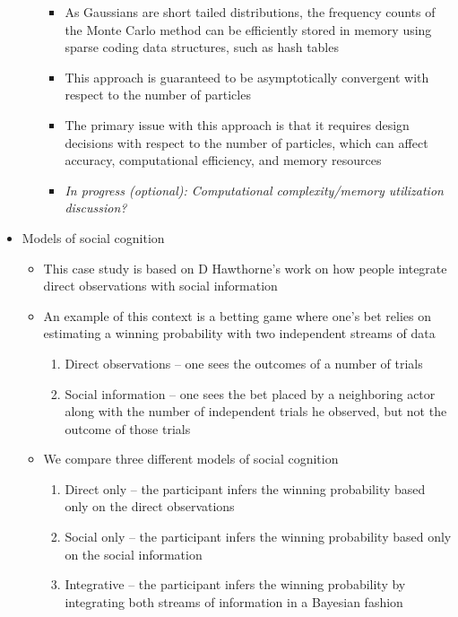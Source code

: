 \documentclass[11pt]{article}
\begin{document}
\begin{itemize}
\begin{itemize}
\begin{itemize}
                        \item As Gaussians are short tailed distributions, the frequency counts of the Monte Carlo method can be efficiently stored in memory using sparse coding data structures, such as hash tables
                        \item This approach is guaranteed to be asymptotically convergent with respect to the number of particles
                        \item The primary issue with this approach is that it requires design decisions with respect to the number of particles, which can affect accuracy, computational efficiency, and memory resources
                        \item \emph{In progress (optional): Computational complexity/memory utilization discussion?}
                    \end{itemize}
            \end{itemize}
        \item Models of social cognition
            \begin{itemize}
                \item This case study is based on D Hawthorne's work on how people integrate direct observations with social information
                \item An example of this context is a betting game where one's bet relies on estimating a winning probability with two independent streams of data
                    \begin{enumerate}
                        \item Direct observations -- one sees the outcomes of a number of trials
                        \item Social information -- one sees the bet placed by a neighboring actor along with the number of independent trials he observed, but not the outcome of those trials
                    \end{enumerate}
                \item We compare three different models of social cognition
                    \begin{enumerate}
                        \item Direct only -- the participant infers the winning probability based only on the direct observations
                        \item Social only -- the participant infers the winning probability based only on the social information
                        \item Integrative -- the participant infers the winning probability by integrating both streams of information in a Bayesian fashion

\end{enumerate}
\end{itemize}
\end{itemize}
\end{document}
